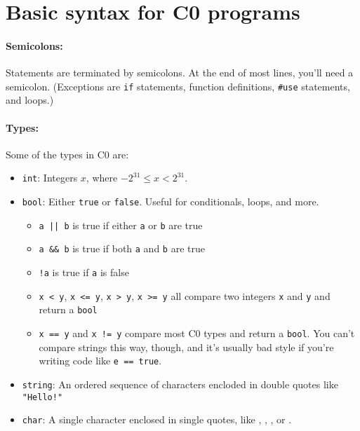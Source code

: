 \section*{Basic syntax for C0 programs%
}

\paragraph{Semicolons:}
Statements are terminated by semicolons.  At the end of most lines,
you'll need a semicolon.  (Exceptions are \lstinline'if' statements,
function definitions, \lstinline'#use' statements, and loops.)

\paragraph{Types:}
Some of the types in C0 are:
\begin{itemize}
\item\lstinline'int': %
  Integers $x$, where $-2^{31} \leq x < 2^{31}$.
\item\lstinline'bool': %
  Either \lstinline'true' or \lstinline'false'. Useful for
  conditionals, loops, and more.
  \begin{itemize}
  \item%
    \lstinline'a || b' is true if either \lstinline'a' or
    \lstinline'b' are true
  \item%
    \lstinline'a && b' is true if both \lstinline'a' and
    \lstinline'b' are true
  \item%
    \lstinline'!a' is true if \lstinline'a' is false
  \item%
    \lstinline'x < y', \lstinline'x <= y', \lstinline'x > y',
    \lstinline'x >= y' all compare two integers \lstinline'x' and
    \lstinline'y' and return a \lstinline'bool'
  \item%
    \lstinline'x == y' and \lstinline'x != y' compare most C0 types
    and return a \lstinline'bool'. You can't compare strings this way,
    though, and it's usually bad style if you're writing code like
    \lstinline'e == true'.
  \end{itemize}
\item\lstinline'string': %
  An ordered sequence of characters encloded in double quotes like \lstinline|"Hello!"|
\item\lstinline'char': %
  A single character enclosed in single quotes, like , ,
  , or .
\end{itemize}

